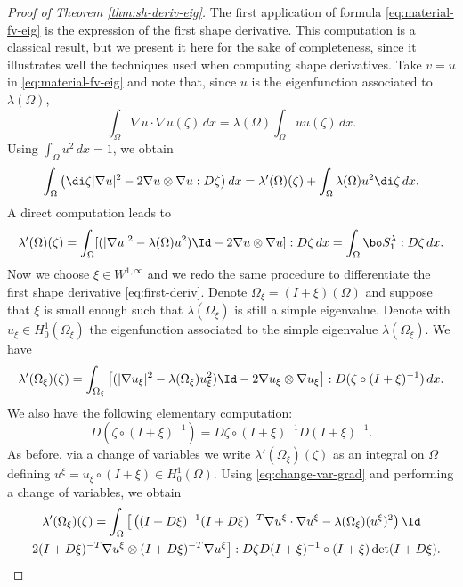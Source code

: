 \begin{proof}[Proof of Theorem \ref{thm:sh-deriv-eig}]
The first application of formula \eqref{eq:material-fv-eig} is the expression of the first shape derivative. This computation is a classical result, but we present it here for the sake of completeness, since it illustrates well the techniques used when computing shape derivatives. Take $v=u$ in \eqref{eq:material-fv-eig} and note that, since $u$ is the eigenfunction associated to $\lambda(\Omega)$,
\[
\int_\Omega \nabla u \cdot \nabla \dot u(\zeta) \, dx = \lambda(\Omega) \int_\Omega u \dot u(\zeta)\, dx.
\]
Using $\int_\Omega u^2\, dx=1$, we obtain
\[
\int_\Omega \left(\di \zeta |\nabla u|^2 -2 \nabla u\otimes \nabla u : D\zeta \right) dx=\lambda'(\Omega)(\zeta)+\int_\Omega \lambda(\Omega)u^2 \di \zeta\, dx .
\]
A direct computation leads to
\begin{equation}
\lambda'(\Omega)(\zeta) = \int_\Omega [(|\nabla u|^2-\lambda(\Omega) u^2)\Id-2\nabla u\otimes \nabla u] : D\zeta\, dx= \int_\Omega \bo S_1^\lambda : D\zeta\, dx .
\label{eq:first-deriv}
\end{equation}
Now we choose $\xi \in W^{1,\infty}$ and we redo the same procedure to differentiate the first shape derivative \eqref{eq:first-deriv}. Denote $\Omega_\xi = (I+\xi)(\Omega)$ and suppose that $\xi$ is small enough such that $\lambda(\Omega_\xi)$ is still a simple eigenvalue. Denote with $u_\xi \in H_0^1(\Omega_\xi)$ the eigenfunction associated to the simple eigenvalue $\lambda(\Omega_\xi)$. We have
\begin{equation}
\lambda'(\Omega_\xi)(\zeta) = \int_{\Omega_\xi} \big[(|\nabla u_\xi |^2-\lambda(\Omega_\xi) u_\xi^2)\Id-2\nabla u_\xi \otimes \nabla u_\xi \big] : D(\zeta\circ (I+\xi)^{-1})\, dx.
\label{eq:first-deriv-moved}
\end{equation}
We also have the following elementary computation:
\[
D(\zeta \circ (I+\xi)^{-1}) = D\zeta \circ (I+\xi)^{-1} D(I+\xi)^{-1}.
\]
As before, via a change of variables we write $\lambda'(\Omega_\xi)(\zeta)$ as an integral on $\Omega$ defining $u^\xi = u_\xi\circ (I+\xi) \in H_0^1(\Omega)$. Using \eqref{eq:change-var-grad} and performing a change of variables, we obtain
\vspace*{-5pt}
\begin{multline*} \lambda'(\Omega_\xi)(\zeta) = \int_\Omega \big[\left((I+D\xi)^{-1}(I+D\xi)^{-T} \nabla u^\xi\cdot \nabla u^\xi -\lambda(\Omega_\xi) (u^\xi)^2\right)\Id \\
-2 (I+D\xi)^{-T} \nabla u^\xi \otimes (I+D\xi)^{-T} \nabla u^\xi\big] : D\zeta D(I+\xi)^{-1}\circ (I+\xi) \det(I+D\xi).
\end{multline*}


\end{proof}
